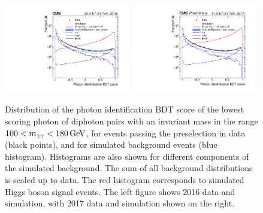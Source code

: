 \begin{figure}[h!]
  \centering
  \includegraphics[width=0.49\textwidth]{Figures/Objects/IDMVA2016}
  \includegraphics[width=0.49\textwidth]{Figures/Objects/IDMVA2017}
  \caption[Photon identification BDT score distributions.]
  {
    Distribution of the photon identification BDT score of the lowest scoring photon
    of diphoton pairs with an invariant mass in the range $100 < m_{\gamma\gamma} < \SI{180}{GeV}$, 
    for events passing the preselection in data (black points), 
    and for simulated background events (blue histogram). 
    Histograms are also shown for different components of the simulated background.
    The sum of all background distributions is scaled up to data. 
    The red histogram corresponds to simulated Higgs boson signal events. 
    The left figure shows 2016 data and simulation, with 2017 data and simulation shown on the right.
  }
  \label{fig:obj_IDMVA}
\end{figure}

